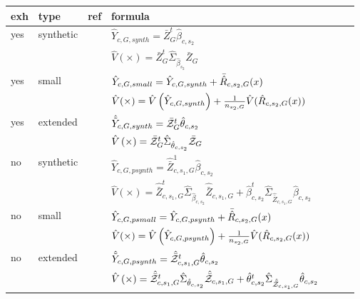 \begin{table}
    \centering
\begin{tabular}{l l l l l r l}
	 exh 	&  type 	&  ref & formula\\ \toprule
			
	 yes 	&  synthetic 	& \analogy{} & $\hat{Y}_{c,G,synth} = \bar{Z}^t_G\hat{\beta}_{c,s_2}$ \\
	   	&    	& \analogy{} & $\hat{V}\left(\times\right) = \bar{Z}^t_G \hat{\Sigma}_{ \hat{\beta}_{s_2}} \bar{Z}_G $\\
\lightrule
			
	 yes 	&  small 	& \analogy{} & $ \hat{Y}_{c,G,small} = \hat{Y}_{c,G,synth} + \bar{\hat{R}}_{c,s_2,G}(x)$\\
	   	&    	& \analogy{} & $  \hat{V}(\times) = \hat{V}\left(\hat{Y}_{c,G,synth}\right) + \frac{1}{n_{s_2,G}}\hat{V}(\hat{R}_{c,s_2,G}(x))$ \\
\lightrule

     yes 	&  extended 	& \cite[eq. 48]{Man13a} & $ \hat{\tilde{Y}}_{c,G,synth} = \bar{\mathcal{Z}}^t_G\hat{\theta}_{c,s_2}$ \\
    &    	& \cite[eq. 49]{Man13a} & $ \hat{V}\left(\times\right) = \bar{\mathcal{Z}}^t_G \hat{\Sigma}_{ \hat{\theta}_{c,s_2}} \bar{\mathcal{Z}}_G$ \\
			
\strongrule
     no 	&  synthetic 	& \cite[eq. 42]{Man13a} & $ \hat{Y}_{c,G,psynth} = \hat{\bar{Z}}^{1}_{c,s_1,G} \hat{\beta}_{c,s_2}$ \\
        &    	& \cite[eq. 43]{Man13a} & $ \hat{V}(\times) =\hat{\bar{Z}}^t_{c,s_1,G} \hat{\Sigma}_{ \hat{\beta}_{c,s_2}} \hat{\bar{Z}}_{c,s_1,G} + \hat{\beta}^t_{c,s_2} \hat{\Sigma}_{ \hat{\bar{Z}}_{c,s_1,G}  } \hat{\beta}_{c,s_2} $ \\
\lightrule
			
     no 	&  small 	& \cite[eq. 44]{Man13a} & $ \hat{Y}_{c,G,psmall} = \hat{Y}_{c,G,psynth} + \bar{\hat{R}}_{c,s_2,G}(x)$ \\
            &      	& \cite[eq. 45]{Man13a} & $ \hat{V}(\times) = \hat{V}\left(\hat{Y}_{c,G,psynth}\right) + \frac{1}{n_{s_2,G}}\hat{V}(\hat{R}_{c,s_2,G}(x))$ \\
\lightrule
     no 	&  extended 	& \cite[eq. 46]{Man13a} & $ \hat{\tilde{Y}}_{c,G,psynth} = \hat{\bar{\mathcal{Z}}}^t_{c,s_1,G}\hat{\theta}_{c,s_2}$ \\
    &    	&  \cite[eq. 47]{Man13a} & $ \hat{V}\left(\times\right) = \hat{\bar{\mathcal{Z}}}^t_{c,s_1,G} \hat{\Sigma}_{ \hat{\theta}_{c,s_2}} \hat{\bar{\mathcal{Z}}}_{c,s_1,G} + \hat{\theta}^t_{c,s_2} \hat{\Sigma}_{ \hat{\bar{\mathcal{Z}}}_{c,s_1,G}  } \hat{\theta}_{c,s_2}$ \\
			

\end{tabular}
\end{table}
